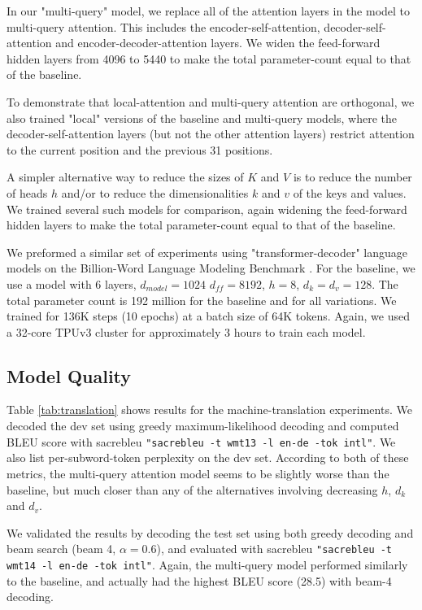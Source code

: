 \documentclass{article}
\begin{document}
In our "multi-query" model, we replace all of the attention layers in the model to multi-query attention.  This includes the encoder-self-attention, decoder-self-attention and encoder-decoder-attention layers.  We widen the feed-forward hidden layers from 4096 to 5440 to make the total parameter-count equal to that of the baseline.

To demonstrate that local-attention and multi-query attention are orthogonal, we also trained "local" versions of the baseline and multi-query models, where the decoder-self-attention layers (but not the other attention layers) restrict attention to the current position and the previous 31 positions.  

A simpler alternative way to reduce the sizes of $K$ and $V$ is to reduce the number of heads $h$ and/or to reduce the dimensionalities $k$ and $v$ of the keys and values.  We trained several such models for comparison, again widening the feed-forward hidden layers to make the total parameter-count equal to that of the baseline.

We preformed a similar set of experiments using "transformer-decoder" language models on the Billion-Word Language Modeling Benchmark \citep{LM1B}.    For the baseline, we use a model with 6 layers, $d_{model}=1024$ $d_{ff}=8192$, $h=8$, $d_k=d_v=128$.  The total parameter count is 192 million for the baseline and for all variations.  We trained for 136K steps (10 epochs) at a batch size of 64K tokens.  Again, we used a 32-core TPUv3 cluster for approximately 3 hours to train each model.

\subsection{Model Quality}

Table \ref{tab:translation} shows results for the machine-translation experiments.  We decoded the dev set using greedy maximum-likelihood decoding and computed BLEU score with sacrebleu \texttt{"sacrebleu -t wmt13 -l en-de -tok intl"}.  We also list per-subword-token perplexity on the dev set.  According to both of these metrics, the multi-query attention model seems to be slightly worse than the baseline, but much closer than any of the alternatives involving decreasing $h$, $d_k$ and $d_v$. 

We validated the results by decoding the test set using both greedy decoding and beam search (beam 4, $\alpha=0.6$), and evaluated with sacrebleu \texttt{"sacrebleu -t wmt14 -l en-de -tok intl"}.  Again, the multi-query model performed similarly to the baseline, and actually had the highest BLEU score (28.5) with beam-4 decoding.
\end{document}
